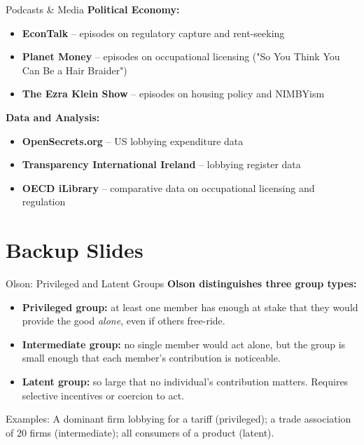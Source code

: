 \documentclass[10pt]{beamer}
\begin{document}
\begin{frame}[allowframebreaks]{Podcasts \& Media}
\textbf{Political Economy:}
\begin{itemize}
\item \textbf{EconTalk} -- episodes on regulatory capture and rent-seeking
\item \textbf{Planet Money} -- episodes on occupational licensing ("So You Think You Can Be a Hair Braider")
\item \textbf{The Ezra Klein Show} -- episodes on housing policy and NIMBYism
\end{itemize}

\framebreak
\textbf{Data and Analysis:}
\begin{itemize}
\item \textbf{OpenSecrets.org} -- US lobbying expenditure data
\item \textbf{Transparency International Ireland} -- lobbying register data
\item \textbf{OECD iLibrary} -- comparative data on occupational licensing and regulation
\end{itemize}
\end{frame}



\appendix

\section*{Backup Slides}

\begin{frame}{Olson: Privileged and Latent Groups}
\textbf{Olson distinguishes three group types:}

\vspace{0.1cm}
\begin{itemize}
\item \textbf{Privileged group:} at least one member has enough at stake that they would provide the good \emph{alone}, even if others free-ride.

\item \textbf{Intermediate group:} no single member would act alone, but the group is small enough that each member's contribution is noticeable.

\item \textbf{Latent group:} so large that no individual's contribution matters.
Requires selective incentives or coercion to act.
\end{itemize}

\vspace{0.1cm}
\alert{Examples:}
A dominant firm lobbying for a tariff (privileged); a trade association of 20 firms (intermediate); all consumers of a product (latent).
\end{frame}
\end{document}
